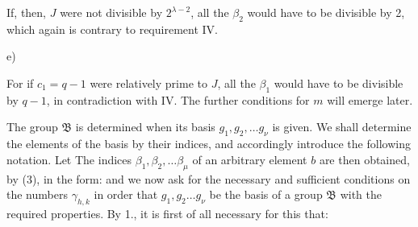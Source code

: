 If, then, $J$ were not divisible by $2^{\lambda-2}$, all the $\beta_2$ would have to be divisible by 2, which again is contrary to requirement IV.

e) 

For if $c_1=q-1$ were relatively prime to $J$, all the $\beta_1$ would have to be divisible by $q-1$, in contradiction with IV. The further conditions for $m$ will emerge later.


The group $\mathfrak{B}$ is determined when its basis $g_1, g_2, \dots g_\nu$ is given. We shall determine the elements of the basis by their indices, and accordingly introduce the following notation. Let
The indices $\beta_1, \beta_2, \dots \beta_\mu$ of an arbitrary element $b$ are then obtained, by (3), in the form:
and we now ask for the necessary and sufficient conditions on the numbers $\gamma_{h,k}$ in order that $g_1, g_2 \dots g_\nu$ be the basis of a group $\mathfrak{B}$ with the required properties. By 1., it is first of all necessary for this that:


